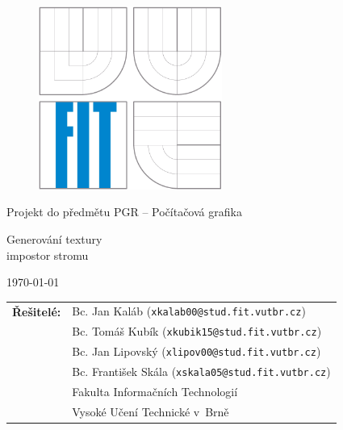 \begin{titlepage}

\vspace*{1cm}

\begin{figure}
  \centering
  \includegraphics[height=6cm]{images/fit.pdf}
\end{figure}

\vspace*{5mm}

\begin{center}
\begin{Large}
Projekt do předmětu PGR -- Počítačová grafika
\end{Large}
\end{center}

\vspace*{5mm}

\begin{center}
\begin{Huge}
Generování textury\\
impostor stromu
\end{Huge}
\end{center}

\vspace*{1cm}

\begin{center}
\begin{Large}
\today
\end{Large}
\end{center}

\vfill

\begin{flushleft}
\begin{large}
\begin{tabular}{ll}

\bf Řešitelé:\hspace{3mm} & Bc. Jan Kaláb (\verb_xkalab00@stud.fit.vutbr.cz_)\\
& Bc. Tomáš Kubík (\verb_xkubik15@stud.fit.vutbr.cz_)\\
& Bc. Jan Lipovský (\verb_xlipov00@stud.fit.vutbr.cz_)\\
& Bc. František Skála (\verb_xskala05@stud.fit.vutbr.cz_)\\
& Fakulta Informačních Technologií\\
& Vysoké Učení Technické v~Brně

\end{tabular}
\end{large}
\end{flushleft}

\end{titlepage}

